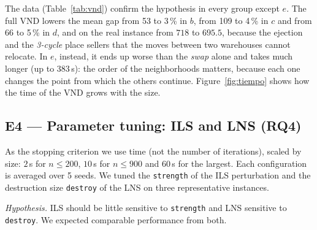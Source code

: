 \documentclass[11pt,a4paper]{article}
\newcommand{\code}[1]{\texttt{#1}}
\begin{document}
\begin{table}[ht]
\centering
\caption{E3: mean true gap (\%) of the final solution, from the best constructive solution, and
time of the full VND (mean and maximum), by group.}
\label{tab:vnd}
\small
{}
\end{table}

The data (Table~\ref{tab:vnd}) confirm the hypothesis in every group except $e$. The full VND
lowers the mean gap from 53 to 3\,\% in $b$, from 109 to 4\,\% in $c$ and from 66 to 5\,\% in $d$,
and on the real instance from $718$ to $695.5$, because the ejection and the \emph{3-cycle} place
sellers that the moves between two warehouses cannot relocate. In $e$, instead, it ends up worse
than the \emph{swap} alone and takes much longer (up to 383\,s): the order of the neighborhoods
matters, because each one changes the point from which the others continue.
Figure~\ref{fig:tiempo} shows how the time of the VND grows with the size.

\subsection{E4 --- Parameter tuning: ILS and LNS (RQ4)}
As the stopping criterion we use time (not the number of iterations), scaled by size: $2$\,s for
$n\le200$, $10$\,s for $n\le900$ and $60$\,s for the largest. Each configuration is averaged over 5
seeds. We tuned the \code{strength} of the ILS perturbation and the destruction size \code{destroy}
of the LNS on three representative instances.

\emph{Hypothesis.} ILS should be little sensitive to \code{strength} and LNS sensitive to
\code{destroy}. We expected comparable performance from both.
\end{document}
